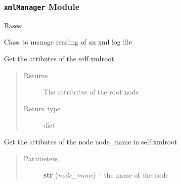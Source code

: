 \documentclass[a4paper,10pt,english]{sphinxmanual}
\begin{document}
\begin{fulllineitems}
\label{commands/apidoc/src:src.test_module.getTmpDirDEFAULT}
\end{fulllineitems}



\subsubsection{\texttt{xmlManager} Module}
\label{commands/apidoc/src:xmlmanager-module}\label{commands/apidoc/src:module-src.xmlManager}

\begin{fulllineitems}
\label{commands/apidoc/src:src.xmlManager.ReadXmlFile}
Bases: 

Class to manage reading of an xml log file

\begin{fulllineitems}
\label{commands/apidoc/src:src.xmlManager.ReadXmlFile.getRootAttrib}
Get the attibutes of the self.xmlroot
\begin{quote}\begin{description}
\item[{Returns}] \leavevmode
The attributes of the root node

\item[{Return type}] \leavevmode
dict

\end{description}\end{quote}

\end{fulllineitems}


\begin{fulllineitems}
\label{commands/apidoc/src:src.xmlManager.ReadXmlFile.get_attrib}
Get the attibutes of the node node\_name in self.xmlroot
\begin{quote}\begin{description}
\item[{Parameters}] \leavevmode
\textbf{str} (\emph{node\_name}) -- the name of the node


\end{description}
\end{quote}
\end{fulllineitems}
\end{fulllineitems}
\end{document}
